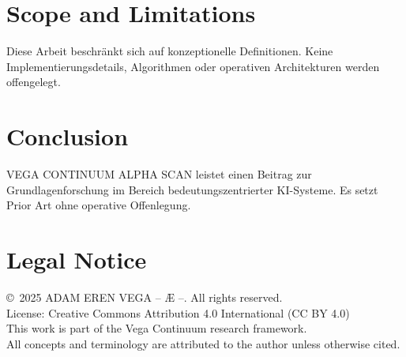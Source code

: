 \documentclass[12pt,a4paper]{article}
\begin{document}
\section{Scope and Limitations}
Diese Arbeit beschränkt sich auf konzeptionelle Definitionen. Keine Implementierungsdetails, Algorithmen oder operativen Architekturen werden offengelegt.

\section{Conclusion}
VEGA CONTINUUM ALPHA SCAN leistet einen Beitrag zur Grundlagenforschung im Bereich bedeutungszentrierter KI-Systeme. Es setzt Prior Art ohne operative Offenlegung.

\section*{Legal Notice}
\copyright\ 2025 ADAM EREN VEGA – Æ –. All rights reserved.\\
License: Creative Commons Attribution 4.0 International (CC BY 4.0)\\
This work is part of the Vega Continuum research framework.\\
All concepts and terminology are attributed to the author unless otherwise cited.
\end{document}
